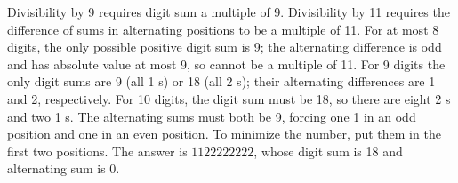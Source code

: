 Divisibility by 9 requires digit sum a multiple of 9. Divisibility by 11 requires the difference of sums in alternating positions to be a multiple of 11. For at most 8 digits, the only possible positive digit sum is 9; the alternating difference is odd and has absolute value at most 9, so cannot be a multiple of 11. For 9 digits the only digit sums are 9 (all 1 s) or 18 (all 2 s); their alternating differences are 1 and 2, respectively. For 10 digits, the digit sum must be 18, so there are eight 2 s and two 1 s. The alternating sums must both be 9, forcing one 1 in an odd position and one in an even position. To minimize the number, put them in the first two positions. The answer is $\boxed{1122222222}$, whose digit sum is 18 and alternating sum is 0.
